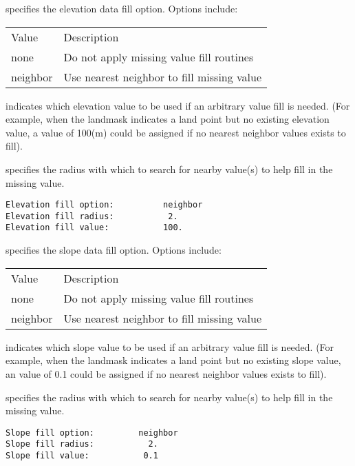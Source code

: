  
  specifies the elevation
 data fill option.  Options include:

 \begin{tabular}{ll}
 Value    & Description                                \\
 none     & Do not apply missing value fill routines   \\
 neighbor & Use nearest neighbor to fill missing value \\
 \end{tabular}

  indicates which elevation
 value to be used if an arbitrary value fill is needed. 
 (For example, when the landmask indicates a land point but no existing 
 elevation value, a value of 100(m) could be assigned if 
 no nearest neighbor values exists to fill).

  specifies the radius with which
 to search for nearby value(s) to help fill in the missing value.
 

 \begin{Verbatim}[frame=single]
Elevation fill option:          neighbor
Elevation fill radius:           2.
Elevation fill value:           100.
 \end{Verbatim}

 
  specifies the slope
 data fill option.  Options include:

 \begin{tabular}{ll}
 Value    & Description                                \\
 none     & Do not apply missing value fill routines   \\
 neighbor & Use nearest neighbor to fill missing value \\
 \end{tabular}

  indicates which slope
 value to be used if an arbitrary value fill is needed. 
 (For example, when the landmask indicates a land point but no existing 
 slope value, an value of 0.1 could be assigned if 
 no nearest neighbor values exists to fill).

  specifies the radius with which
 to search for nearby value(s) to help fill in the missing value.
 

 \begin{Verbatim}[frame=single]
Slope fill option:         neighbor
Slope fill radius:           2.
Slope fill value:           0.1
 \end{Verbatim}

